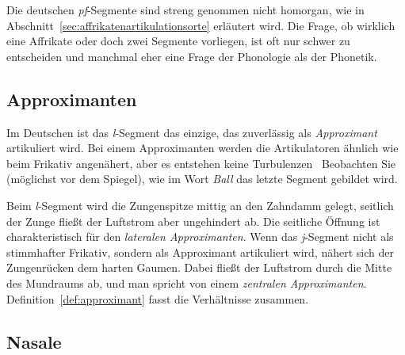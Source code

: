 Die deutschen \textit{pf}-Segmente sind \zB streng genommen nicht homorgan, wie in Abschnitt~\ref{sec:affrikatenartikulationsorte} erläutert wird.
Die Frage, ob wirklich eine Affrikate oder doch zwei Segmente vorliegen, ist oft nur schwer zu entscheiden und manchmal eher eine Frage der Phonologie als der Phonetik.

\subsection{Approximanten}

\label{sec:lateraleapproximanten}

Im Deutschen ist das \textit{l}-Segment das einzige, das zuverlässig als \textit{Approximant} artikuliert wird.
Bei einem Approximanten werden die Artikulatoren ähnlich wie beim Frikativ angenähert, aber es entstehen keine Turbulenzen
\TuBegin~Beobachten Sie (möglichst vor dem Spiegel), wie im Wort \textit{Ball} das letzte Segment gebildet wird.

Beim \textit{l}-Segment wird die Zungenspitze mittig an den Zahndamm gelegt, seitlich der Zunge fließt der Luftstrom aber ungehindert ab.
Die seitliche Öffnung ist charakteristisch für den \textit{lateralen Approximanten}.
Wenn das \textit{j}-Segment nicht als stimmhafter Frikativ, sondern als Approximant artikuliert wird, nähert sich der Zungenrücken dem harten Gaumen.
Dabei fließt der Luftstrom durch die Mitte des Mundraums ab, und man spricht von einem \textit{zentralen Approximanten}.
Definition~\ref{def:approximant} fasst die Verhältnisse zusammen.


\subsection{Nasale}

\label{sec:nasale}

